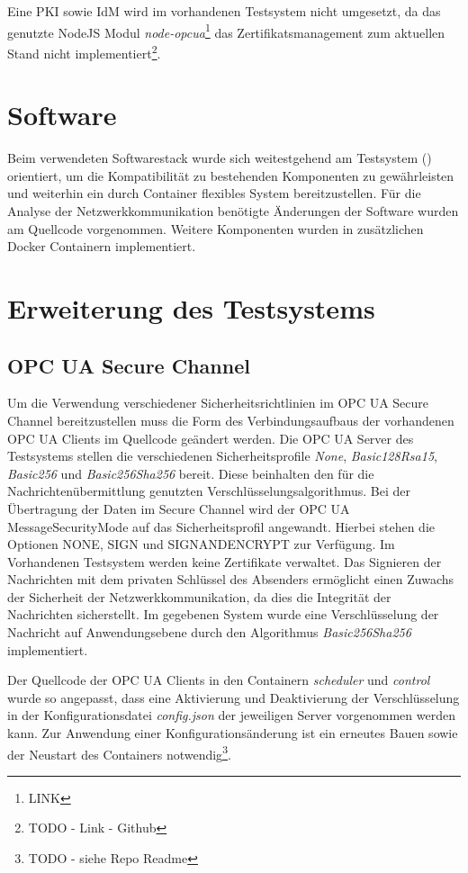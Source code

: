 Eine \ac{PKI} sowie \ac{IdM} wird im vorhandenen Testsystem nicht umgesetzt, da das genutzte NodeJS Modul \textit{node-opcua}\footnote{LINK} das Zertifikatsmanagement zum aktuellen Stand nicht implementiert\footnote{TODO - Link - Github}.

\section{Software}
Beim verwendeten Softwarestack wurde sich weitestgehend am Testsystem (\cite{Weber2018}) orientiert, um die Kompatibilität zu bestehenden Komponenten zu gewährleisten und weiterhin ein durch Container flexibles System bereitzustellen. Für die Analyse der Netzwerkkommunikation benötigte Änderungen der Software wurden am Quellcode vorgenommen. Weitere Komponenten wurden in zusätzlichen Docker Containern implementiert.

\section{Erweiterung des Testsystems}
\subsection{\ac{OPC UA} Secure Channel}
\label{Impl:OPC UA Secure Channel}
Um die Verwendung verschiedener Sicherheitsrichtlinien im \ac{OPC UA} Secure Channel bereitzustellen muss die Form des Verbindungsaufbaus der vorhandenen \ac{OPC UA} Clients im Quellcode geändert werden. Die \ac{OPC UA} Server des Testsystems stellen die verschiedenen Sicherheitsprofile \textit{None}, \textit{Basic128Rsa15}, \textit{Basic256} und \textit{Basic256Sha256} bereit. Diese beinhalten den für die Nachrichtenübermittlung genutzten Verschlüsselungsalgorithmus. Bei der Übertragung der Daten im Secure Channel wird der \ac{OPC UA} MessageSecurityMode auf das Sicherheitsprofil angewandt. Hierbei stehen die Optionen NONE, SIGN und SIGNANDENCRYPT zur Verfügung. Im Vorhandenen Testsystem werden keine Zertifikate verwaltet. Das Signieren der Nachrichten mit dem privaten Schlüssel des Absenders ermöglicht einen Zuwachs der Sicherheit der Netzwerkkommunikation, da dies die Integrität der Nachrichten sicherstellt. Im gegebenen System wurde eine Verschlüsselung der Nachricht auf Anwendungsebene durch den Algorithmus \textit{Basic256Sha256} implementiert.

Der Quellcode der \ac{OPC UA} Clients in den Containern \textit{scheduler} und \textit{control} wurde so angepasst, dass eine Aktivierung und Deaktivierung der Verschlüsselung in der Konfigurationsdatei \textit{config.json} der jeweiligen Server vorgenommen werden kann. Zur Anwendung einer Konfigurationsänderung ist ein erneutes Bauen sowie der Neustart des Containers notwendig\footnote{TODO - siehe Repo Readme}.

